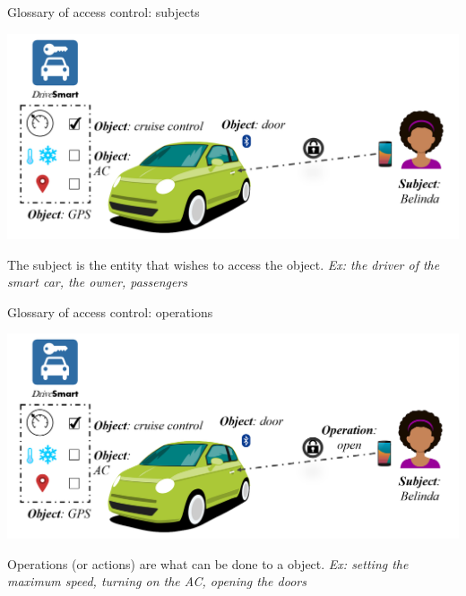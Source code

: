 \begin{frame}{Glossary of access control: subjects}
    \begin{center}
        \includegraphics[scale=0.33]{Figures/ex_intro_3.png}
    \end{center}
    
    \begin{definition}
        The \alert{subject} is the entity that wishes to access the object.
            \newline \emph{Ex: the driver of the smart car, the owner, passengers}
    \end{definition}
\end{frame}

\begin{frame}{Glossary of access control: operations}
    \begin{center}
        \includegraphics[scale=0.33]{Figures/ex_intro_4.png}
    \end{center}
    
    \begin{definition}
        \alert{Operations} (or actions) are what can be done to a object.
        \newline \emph{Ex: setting the maximum speed, turning on the AC, opening the doors}
    \end{definition}
\end{frame}

